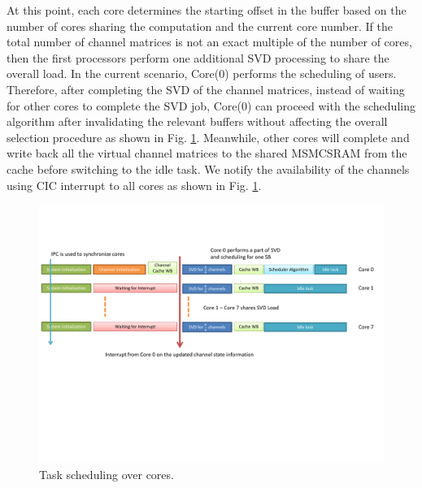 \documentclass[conference,letterpaper]{./../../IEEE/IEEEtran}
\begin{document}
At this point, each core determines the starting offset in the buffer based on the number of cores sharing the computation and the current core number. If the total number of channel matrices is not an exact multiple of the number of cores, then the first  processors perform one additional SVD processing to share the overall load. In the current scenario, Core(0) performs the scheduling of users. Therefore, after completing the SVD of the channel matrices, instead of waiting for other cores to complete the SVD job, Core(0) can proceed with the scheduling algorithm after invalidating the relevant buffers without affecting the overall selection procedure as shown in Fig. \ref{sched_cores}. Meanwhile, other cores will complete and write back all the virtual channel matrices to the shared \ac{MSMCSRAM} from the cache before switching to the idle task. We notify the availability of the channels using \ac{CIC} interrupt to all cores as shown in Fig. \ref{sched_cores}.
\begin{figure}
	\centering
	\includegraphics[trim=0in 3.25in 0in 1.5in,width=\columnwidth]{overall_scheduling}
	\caption{Task scheduling over  cores.}
	\label{sched_cores}
	\vspace{-0.15in}
\end{figure}
\end{document}
